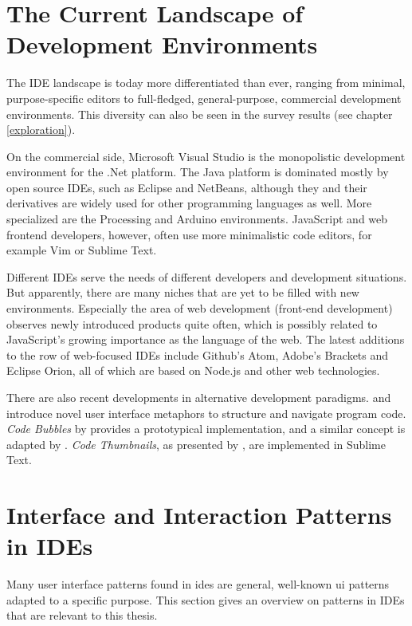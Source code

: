 \section{The Current Landscape of Development
Environments}\label{the-current-landscape-of-development-environments}

The IDE landscape is today more differentiated than ever, ranging from
minimal, purpose-specific editors to full-fledged, general-purpose,
commercial development environments. This diversity can also be seen in
the survey results (see chapter \ref{exploration}).

On the commercial side, Microsoft Visual Studio is the monopolistic
development environment for the .Net platform. The Java platform is
dominated mostly by open source IDEs, such as Eclipse and NetBeans,
although they and their derivatives are widely used for other
programming languages as well. More specialized are the Processing and
Arduino environments. JavaScript and web frontend developers, however,
often use more minimalistic code editors, for example Vim or Sublime
Text.

Different IDEs serve the needs of different developers and development
situations. But apparently, there are many niches that are yet to be
filled with new environments. Especially the area of web development
(front-end development) observes newly introduced products quite often,
which is possibly related to JavaScript’s growing importance as the
language of the web. The latest additions to the row of web-focused IDEs
include Github’s Atom, Adobe’s Brackets and Eclipse Orion, all of which
are based on Node.js and other web technologies.

There are also recent developments in alternative development paradigms.
 and  introduce novel user
interface metaphors to structure and navigate program code. \emph{Code
Bubbles} by  provides a prototypical implementation,
and a similar concept is adapted by . \emph{Code
Thumbnails}, as presented by , are implemented in
Sublime Text.

\section{Interface and Interaction Patterns in
IDEs}\label{interface-and-interaction-patterns-in-ides}

Many user interface patterns found in \glspl{ide} are general,
well-known \ac{ui} patterns adapted to a specific purpose. This section
gives an overview on patterns in IDEs that are relevant to this thesis.


